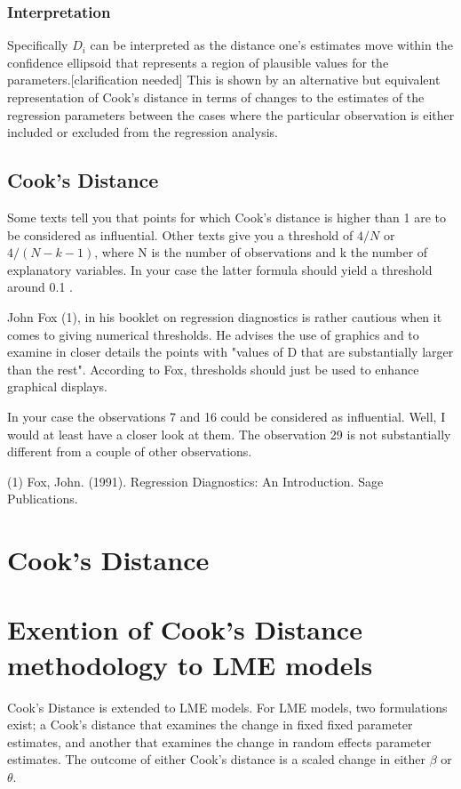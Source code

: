 \documentclass[12pt, a4paper]{article}
\begin{document}
\subsubsection{Interpretation}
Specifically $D_i$ can be interpreted as the distance one's estimates move within the confidence ellipsoid that represents a region of plausible values for the parameters.[clarification needed] This is shown by an alternative but equivalent representation of Cook's distance in terms of changes to the estimates of the regression parameters between the cases where the particular observation is either included or excluded from the regression analysis.



\subsection{Cook's Distance}
Some texts tell you that points for which Cook's distance is higher than 1 are to be considered as influential. Other texts give you a threshold of $4/N$ or $4/(N−k−1)$, where N is the number of observations and k the number of explanatory variables. In your case the latter formula should yield a threshold around 0.1 .

John Fox (1), in his booklet on regression diagnostics is rather cautious when it comes to giving numerical thresholds. He advises the use of graphics and to examine in closer details the points with "values of D that are substantially larger than the rest". According to Fox, thresholds should just be used to enhance graphical displays.

In your case the observations 7 and 16 could be considered as influential. Well, I would at least have a closer look at them. The observation 29 is not substantially different from a couple of other observations.

(1) Fox, John. (1991). Regression Diagnostics: An Introduction. Sage Publications.






\section{Cook's Distance} %



\section{Exention of Cook's Distance methodology to LME models}
 Cook's Distance is extended to LME models.  For LME models, two formulations exist; a Cook's distance that examines the change in fixed fixed parameter estimates, and another that examines the change in random effects parameter estimates. The outcome of either Cook's distance is a scaled change in either $\beta$ or $\theta$.
\end{document}
